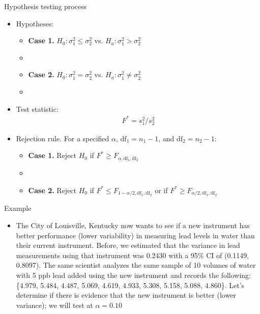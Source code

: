 \documentclass[xcolor=dvipsnames]{beamer}
\begin{document}
\begin{frame}{Hypothesis testing process}
		\begin{itemize}
		\item Hypotheses:
		\begin{itemize}
			\item \textbf{Case 1.} $H_0: \sigma_1^2 \leq \sigma_2^2$ vs. $H_a: \sigma_1^2 > \sigma_2^2$
			\item[]
			\item \textbf{Case 2.} $H_0: \sigma_1^2 = \sigma_2^2$ vs. $H_a: \sigma_1^2 \neq \sigma_2^2$
			\item[]
		\end{itemize}
		
		\item Test statistic:
		\begin{gather*}
		F^* = s_1^2 /s_2^2
		\end{gather*}
		
		\item Rejection rule. For a specified $\alpha$, $\text{df}_1 = n_1 - 1$, and $\text{df}_2 = n_2-1$:
		\begin{itemize}
			\item \textbf{Case 1.} Reject $H_0$ if $F^* \geq F_{\alpha, \text{df}_1,\text{df}_2}$
			\item[]
			\item \textbf{Case 2.} Reject $H_0$ if $F^* \leq F_{1-\alpha / 2, \text{df}_1,\text{df}_2}$ or if $F^* \geq F_{\alpha / 2, \text{df}_1,\text{df}_2} $
		\end{itemize}
	\end{itemize}
\end{frame}

\begin{frame}{Example}
	\begin{itemize}
		\item The City of Louisville, Kentucky now wants to see if a new instrument has better performance (lower variability) in measuring lead levels in water than their current instrument. Before, we estimated that the variance in lead measurements using that instrument was 0.2430 with a 95\% CI of (0.1149, 0.8097). The same scientist analyzes the same sample of 10 volumes of water with 5 ppb lead added using the new instrument and records the following: \{4.979, 5.484, 4.487, 5.069, 4.619, 4.933, 5.308, 5.158, 5.088, 4.860\}. Let's determine if there is evidence that the new instrument is better (lower variance); we will test at $\alpha = 0.10$
	\end{itemize}
\end{frame}
\end{document}
